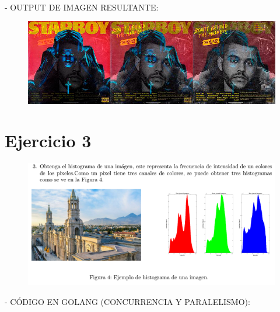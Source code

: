 \documentclass{article}
\begin{document}
\\
\newpage
- OUTPUT DE IMAGEN RESULTANTE:
\begin{figure}[h]
\centering
\includegraphics[scale=1]{RES2.png}
\end{figure}
\newpage

\section{Ejercicio 3}
\begin{figure}[h]
\centering
\includegraphics[scale=1]{EJ3.png}
\end{figure}
- CÓDIGO EN GOLANG (CONCURRENCIA Y PARALELISMO):
\end{document}
